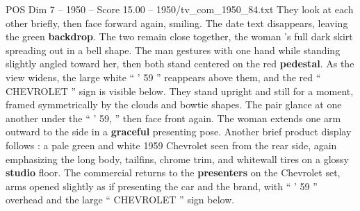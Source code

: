 \begin{textsample}{POS Dim 7 – 1950 – Score 15.00 – 1950/tv\_com\_1950\_84.txt}
They look at each other briefly, then face forward again, smiling.
The date text disappears, leaving the green \textbf{backdrop}.
The two remain close together, the woman ’s full dark skirt spreading out in a bell shape.
The man gestures with one hand while standing slightly angled toward her, then both stand centered on the red \textbf{pedestal}.
As the view widens, the large white “ ’ 59 ” reappears above them, and the red “ CHEVROLET ” sign is visible below.
They stand upright and still for a moment, framed symmetrically by the clouds and bowtie shapes.
The pair glance at one another under the “ ’ 59, ” then face front again.
The woman extends one arm outward to the side in a \textbf{graceful} presenting pose.
Another brief product display follows : a pale green and white 1959 Chevrolet seen from the rear side, again emphasizing the long body, tailfins, chrome trim, and whitewall tires on a glossy \textbf{studio} floor.
The commercial returns to the \textbf{presenters} on the Chevrolet set, arms opened slightly as if presenting the car and the brand, with “ ’ 59 ” overhead and the large “ CHEVROLET ” sign below.

\end{textsample}

